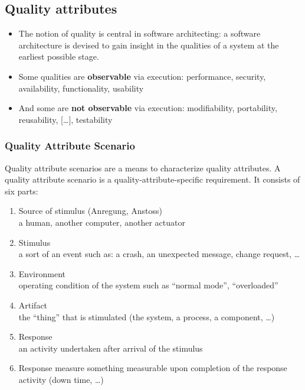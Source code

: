 \hypertarget{quality-attributes}{%
\subsection{Quality attributes}\label{quality-attributes}}

\begin{itemize}
\tightlist
\item
  The notion of quality is central in software architecting: a software
  architecture is devised to gain insight in the qualities of a system
  at the earliest possible stage.
\item
  Some qualities are \textbf{observable} via execution: performance,
  security, availability, functionality, usability
\item
  And some are \textbf{not observable} via execution: modifiability,
  portability, reusability, {[}\ldots{}{]}, testability
\end{itemize}


\hypertarget{quality-attribute-scenario}{%
\subsubsection{Quality Attribute
Scenario}\label{quality-attribute-scenario}}

Quality attribute scenarios are a means to characterize quality
attributes. A quality attribute scenario is a quality-attribute-specific
requirement. It consists of six parts:

\begin{enumerate}
\def\labelenumi{\arabic{enumi}.}
\tightlist
\item
  Source of stimulus (Anregung, Anstoss)\\
  a human, another computer, another actuator
\item
  Stimulus\\
  a sort of an event such as: a crash, an unexpected message, change
  request, \ldots{}
\item
  Environment\\
  operating condition of the system such as ``normal mode'',
  ``overloaded''
\item
  Artifact\\
  the ``thing'' that is stimulated (the system, a process, a component,
  \ldots{})
\item
  Response\\
  an activity undertaken after arrival of the stimulus
\item
  Response measure something measurable upon completion of the response
  activity (down time, \ldots{})
\end{enumerate}

